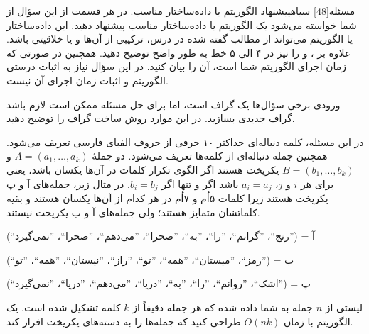 ‌مسئله[48] ‌سیاه{پیشنهاد الگوریتم یا داده‌ساختار مناسب}. در هر قسمت از این سؤال از شما خواسته می‌شود یک الگوریتم یا داده‌ساختار مناسب پیشنهاد دهید. این داده‌ساختار یا الگوریتم می‌تواند از مطالب گفته شده در درس، ترکیبی از آن‌ها و یا خلاقیتی باشد. علاوه بر ،  و  را نیز در ۴ الی ۵ خط به طور واضح توضیح دهید. همچنین در صورتی که زمان اجرای الگوریتم شما  است، آن را بیان کنید. در این سؤال نیاز به اثبات درستی الگوریتم و اثبات زمان اجرای آن نیست.

ورودی برخی سؤال‌ها یک گراف است، اما برای حل مسئله ممکن است لازم باشد گراف جدیدی بسازید. در این موارد روش ساخت گراف را توضیح دهید.


در این مسئله، کلمه دنباله‌ای حداکثر ۱۰ حرفی از حروف الفبای فارسی تعریف می‌شود. همچنین جمله دنباله‌ای از کلمه‌ها تعریف می‌شود. دو جملۀ 
$A = (a_1, \dots, a_k)$
و
$B = (b_1, \dots, b_k)$
یکریخت هستند اگر الگوی تکرار کلمات در آن‌ها یکسان باشد، یعنی برای هر $i$ و $j$،
$a_i = a_j$
باشد اگر و تنها اگر
$b_i = b_j$.
در مثال زیر، جمله‌های آ و پ یکریخت هستند زیرا کلمات ۵اُم و ۷اُم در هر کدام از آن‌ها یکسان هستند و بقیه کلماتشان متمایز هستند؛ ولی جمله‌های آ و ب یکریخت نیستند.

آ = 
(''رنج``، ''گرانم``، ''را``، ''به``، ''صحرا``، ''می‌دهم``، ''صحرا``، ''نمی‌گیرد‍``‍‍‍)

ب =
(''رمز``، ''میستان``، ''همه``، ''تو``، ''راز``، ''نیستان``، ''همه``، ''تو``)

پ =
(''اشک``، ''روانم``، ''را``، ''به``، ''دریا``، ''می‌دهم``، ''دریا``، ''نمی‌گیرد``)

لیستی از $n$ جمله به شما داده شده که هر جمله دقیقاً از $k$ کلمه تشکیل شده است. یک الگوریتم با زمان $O(nk)$ طراحی کنید که جمله‌ها را به دسته‌های یکریخت افراز کند.


